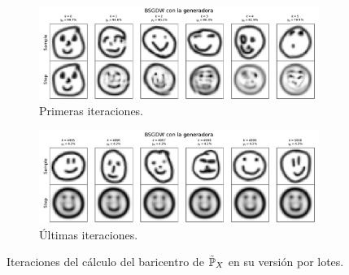 \begin{figure}[H]
    \centering
    \begin{subfigure}[b]{0.75\textwidth}
        \includegraphics[width=\textwidth]{img/sgdw-iters/batch-first-iters-GAN.pdf}
        \caption{Primeras iteraciones.}
        \label{fig:batch-first-iters-GAN}
    \end{subfigure}
    \begin{subfigure}[b]{0.75\textwidth}
        \includegraphics[width=\textwidth]{img/sgdw-iters/batch-last-iters-GAN.pdf}
        \caption{Últimas iteraciones.}
        \label{fig:batch-last-iters-GAN}
    \end{subfigure}
    \caption{Iteraciones del cálculo del baricentro de $\tilde\Prob_X$ en su versión por lotes.}
    \label{fig:batch-iters-GAN}
\end{figure}















